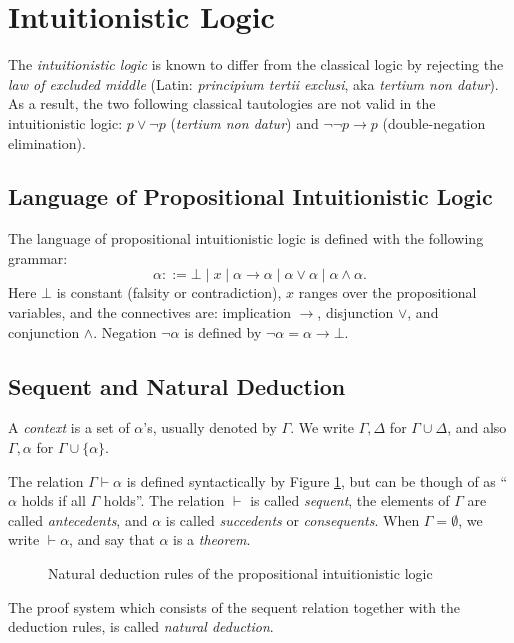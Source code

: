 \section{Intuitionistic Logic}

The \textit{intuitionistic logic} is known to differ from the classical logic by rejecting the \textit{law of excluded middle} (Latin: \textit{principium tertii exclusi}, aka \textit{tertium non datur}). As a result, the two following classical tautologies are not valid in the intuitionistic logic: $p \vee \neg p$ (\textit{tertium non datur}) and $\neg \neg p \rightarrow p$ (double-negation elimination).

\subsection{Language of Propositional Intuitionistic Logic}

The language of propositional intuitionistic logic is defined with the following grammar:
\[
\alpha ::= \bot \mid x \mid \alpha \rightarrow \alpha \mid \alpha \vee \alpha \mid \alpha \wedge \alpha.
\]
Here $\bot$ is constant (falsity or contradiction), $x$ ranges over the propositional variables, and the connectives are: implication $\rightarrow$, disjunction $\vee$, and conjunction $\wedge$. Negation $\neg \alpha$ is defined by $\neg \alpha = \alpha \rightarrow \bot$.

\subsection{Sequent and Natural Deduction}

A \textit{context} is a set of $\alpha$'s, usually denoted by $\Gamma$. We write $\Gamma, \Delta$ for $\Gamma \cup \Delta$, and also $\Gamma, \alpha$ for $\Gamma \cup \{\alpha\}$. 

\begin{definition}[Sequent]
The relation $\Gamma \vdash \alpha$ is defined syntactically by Figure \ref{fig:intuitionistic-logic-natural-deduction}, but can be though of as ``$\alpha$ holds if all $\Gamma$ holds''. The relation $\vdash$ is called \textit{sequent}, the elements of $\Gamma$ are called \textit{antecedents}, and $\alpha$ is called \textit{succedents} or \textit{consequents}. When $\Gamma = \emptyset$, we write $\vdash \alpha$, and say that $\alpha$ is a \textit{theorem}.
\end{definition}

\begin{figure}
    \centering
    
    \caption{Natural deduction rules of the propositional intuitionistic logic}
    \label{fig:intuitionistic-logic-natural-deduction}
\end{figure}

The proof system which consists of the sequent relation together with the deduction rules, is called \textit{natural deduction}.